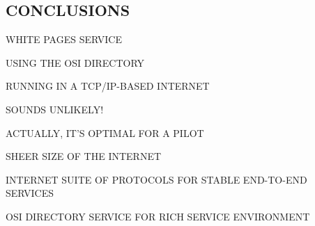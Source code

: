 \begin{bwslide}
\part*	{CONCLUSIONS}\bf

\begin{nrtc}
\item	WHITE PAGES SERVICE
    \begin{nrtc}
    \item	USING THE OSI DIRECTORY

    \item	RUNNING IN A TCP/IP-BASED INTERNET
    \end{nrtc}
    SOUNDS UNLIKELY!

\item	ACTUALLY, IT'S OPTIMAL FOR A PILOT
    \begin{nrtc}
    \item	SHEER SIZE OF THE INTERNET

    \item	INTERNET SUITE OF PROTOCOLS FOR STABLE END-TO-END SERVICES

    \item	OSI DIRECTORY SERVICE FOR RICH SERVICE ENVIRONMENT
    \end{nrtc}
\end{nrtc}
\end{bwslide}



